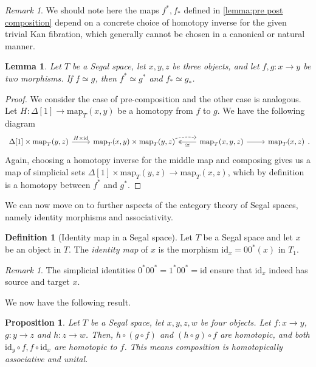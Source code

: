 \documentclass[11pt, a4paper]{amsart}
\newcommand{\map}{\mathrm{map}}
\newcommand{\id}{\mathrm{id}}
\newtheorem{lemma}[equation]{Lemma}
\newtheorem{proposition}[equation]{Proposition}
\theoremstyle{definition}
\newtheorem{definition}[equation]{Definition}
\theoremstyle{remark}
\newtheorem{remark}[equation]{Remark}
\numberwithin{equation}{section}
\begin{document}
\begin{remark}
 We should note here the maps $f^*,f_*$ defined in \cref{lemma:pre post composition} depend on a concrete choice of homotopy inverse for the given trivial Kan fibration, which generally cannot be chosen in a canonical or natural manner.
\end{remark}

\begin{lemma} \label{lemma:homotopic morphisms pre post composition}
  Let $T$ be a Segal space, let $x,y,z$ be three objects, and let $f,g\colon x \to y$ be two morphisms. If $f \simeq g$, then $f^* \simeq g^*$ and $f_* \simeq g_*$.
\end{lemma}

\begin{proof}
 We consider the case of pre-composition and the other case is analogous. Let $H\colon \Delta[1] \to \map_T(x,y)$ be a homotopy from $f$ to $g$. We have the following diagram
\[
 \begin{tikzcd}
  \Delta[1] \times \map_T(y,z) \arrow[r, "H \times \id"] & \map_T(x,y) \times \map_T(y,z) \arrow[r, dashed, bend left= 10, start anchor={[yshift=-0.15cm, xshift=0.15cm]}] & \map_T(x,y,z) \arrow[l, "\simeq", twoheadrightarrow] \arrow[r] & \map_T(x,z)
 \end{tikzcd}.
 \]
 Again, choosing a homotopy inverse for the middle map and composing gives us a map of simplicial sets $\Delta[1] \times \map_T(y,z) \to \map_T(x,z)$, which by definition is a homotopy between $f^*$ and $g^*$.
\end{proof}

We can now move on to further aspects of the category theory of Segal spaces, namely identity morphisms and associativity.

\begin{definition}[Identity map in a Segal space] \label{def:identity map}
  Let $T$ be a Segal space and let $x$ be an object in $T$. The \emph{identity map} of $x$ is the morphism $\id_x = 00^*(x)$ in $T_1$.
\end{definition}

\begin{remark}
  The simplicial identities $0^*00^* = 1^*00^* = \id$ ensure that $\id_x$ indeed has source and target $x$.
\end{remark}

We now have the following result. 

 \begin{proposition} \label{prop:associativity and identity of segal space}
  Let $T$ be a Segal space, let $x,y,z,w$ be four objects. Let $f\colon x \to y$, $g\colon y \to z$ and $h\colon z \to w$. Then, $h \circ (g \circ f)$ and $(h \circ g ) \circ f$ are homotopic, and both $\id_y \circ f, f \circ \id_x$ are homotopic to $f$. This means composition is homotopically associative and unital.
 \end{proposition}
\end{document}
